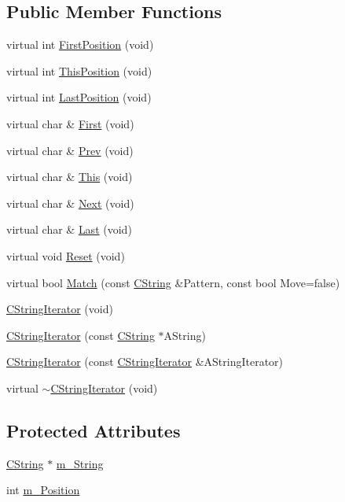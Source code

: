 \subsection*{Public Member Functions}
\begin{DoxyCompactItemize}
\item 
virtual int \hyperlink{classCStringIterator_a739e5b2467a7fcda22960e857dd2ecc2}{First\-Position} (void)
\item 
virtual int \hyperlink{classCStringIterator_af71c8376f7118488e50d274ff0929941}{This\-Position} (void)
\item 
virtual int \hyperlink{classCStringIterator_ad999b0402cd3261b42e2a6395fd483cb}{Last\-Position} (void)
\item 
virtual char \& \hyperlink{classCStringIterator_a606e84881c06c75e32399be5e89d8542}{First} (void)
\item 
virtual char \& \hyperlink{classCStringIterator_adc6c3c8fd47262015aff531a8fea44b3}{Prev} (void)
\item 
virtual char \& \hyperlink{classCStringIterator_aac7b3adb4f5d80c98399c4fe587f4c4b}{This} (void)
\item 
virtual char \& \hyperlink{classCStringIterator_a04eb992396cb473486cd13982974d984}{Next} (void)
\item 
virtual char \& \hyperlink{classCStringIterator_aa8a8dab6db490395dba9d522d6cead2f}{Last} (void)
\item 
virtual void \hyperlink{classCStringIterator_a4b926ac119cd8a0a6279e149a1ed4c73}{Reset} (void)
\item 
virtual bool \hyperlink{classCStringIterator_a942c6a942235d37549673ca0d9772614}{Match} (const \hyperlink{classCString}{C\-String} \&Pattern, const bool Move=false)
\item 
\hyperlink{classCStringIterator_ac28fd36bc78ffd2f2ab632ffdada2c77}{C\-String\-Iterator} (void)
\item 
\hyperlink{classCStringIterator_a137dc959bb8d6cee82da7492233f1697}{C\-String\-Iterator} (const \hyperlink{classCString}{C\-String} $\ast$A\-String)
\item 
\hyperlink{classCStringIterator_a2b55ed36314efb52902f75ccf524874a}{C\-String\-Iterator} (const \hyperlink{classCStringIterator}{C\-String\-Iterator} \&A\-String\-Iterator)
\item 
virtual \hyperlink{classCStringIterator_acbf9c48a0439047d099d29878c9e24e3}{$\sim$\-C\-String\-Iterator} (void)
\end{DoxyCompactItemize}
\subsection*{Protected Attributes}
\begin{DoxyCompactItemize}
\item 
\hyperlink{classCString}{C\-String} $\ast$ \hyperlink{classCStringIterator_a2ec3bb2a3446e69b641befea3f041170}{m\-\_\-\-String}
\item 
int \hyperlink{classCStringIterator_a53f30020be11b8274529d107a6b7e6b4}{m\-\_\-\-Position}
\end{DoxyCompactItemize}


